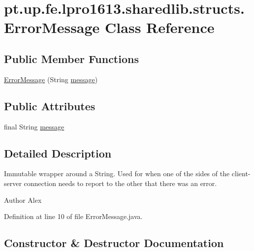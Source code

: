 \hypertarget{classpt_1_1up_1_1fe_1_1lpro1613_1_1sharedlib_1_1structs_1_1_error_message}{}\section{pt.\+up.\+fe.\+lpro1613.\+sharedlib.\+structs.\+Error\+Message Class Reference}
\label{classpt_1_1up_1_1fe_1_1lpro1613_1_1sharedlib_1_1structs_1_1_error_message}
\subsection*{Public Member Functions}
\begin{DoxyCompactItemize}
\item 
\hyperlink{classpt_1_1up_1_1fe_1_1lpro1613_1_1sharedlib_1_1structs_1_1_error_message_ae8c08a02ae434a517953f4d80e3fe5da}{Error\+Message} (String \hyperlink{classpt_1_1up_1_1fe_1_1lpro1613_1_1sharedlib_1_1structs_1_1_error_message_ad30e3949895b468c79beb5aacd6f6150}{message})
\end{DoxyCompactItemize}
\subsection*{Public Attributes}
\begin{DoxyCompactItemize}
\item 
final String \hyperlink{classpt_1_1up_1_1fe_1_1lpro1613_1_1sharedlib_1_1structs_1_1_error_message_ad30e3949895b468c79beb5aacd6f6150}{message}
\end{DoxyCompactItemize}


\subsection{Detailed Description}
Immutable wrapper around a String. Used for when one of the sides of the client-\/server connection needs to report to the other that there was an error.

\begin{DoxyAuthor}{Author}
Alex 
\end{DoxyAuthor}


Definition at line 10 of file Error\+Message.\+java.



\subsection{Constructor \& Destructor Documentation}
\hypertarget{classpt_1_1up_1_1fe_1_1lpro1613_1_1sharedlib_1_1structs_1_1_error_message_ae8c08a02ae434a517953f4d80e3fe5da}{}\label{classpt_1_1up_1_1fe_1_1lpro1613_1_1sharedlib_1_1structs_1_1_error_message_ae8c08a02ae434a517953f4d80e3fe5da} 
